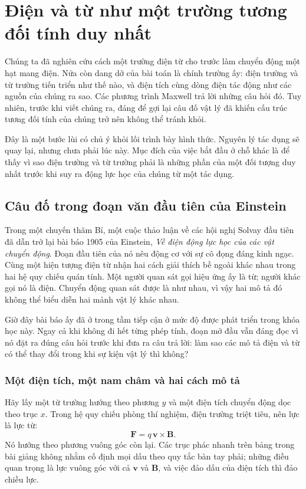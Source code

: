 \chapter{Điện và từ như một trường tương đối tính duy nhất}

Chúng ta đã nghiên cứu cách một trường điện từ cho trước làm chuyển động một hạt mang điện. Nửa còn dang dở của bài toán là chính trường ấy: điện trường và từ trường tiến triển như thế nào, và điện tích cùng dòng điện tác động như các nguồn của chúng ra sao. Các phương trình Maxwell trả lời những câu hỏi đó. Tuy nhiên, trước khi viết chúng ra, đáng để gợi lại câu đố vật lý đã khiến cấu trúc tương đối tính của chúng trở nên không thể tránh khỏi.

Đây là một bước lùi có chủ ý khỏi lối trình bày hình thức. Nguyên lý tác dụng sẽ quay lại, nhưng chưa phải lúc này. Mục đích của việc bắt đầu ở chỗ khác là để thấy vì sao điện trường và từ trường phải là những phần của một đối tượng duy nhất trước khi suy ra động lực học của chúng từ một tác dụng.

\section{Câu đố trong đoạn văn đầu tiên của Einstein}

Trong một chuyến thăm Bỉ, một cuộc thảo luận về các hội nghị Solvay đầu tiên đã dẫn trở lại bài báo 1905 của Einstein, \emph{Về điện động lực học của các vật chuyển động}. Đoạn đầu tiên của nó nêu động cơ với sự cô đọng đáng kinh ngạc. Cùng một hiện tượng điện từ nhận hai cách giải thích bề ngoài khác nhau trong hai hệ quy chiếu quán tính. Một người quan sát gọi hiệu ứng ấy là từ; người khác gọi nó là điện. Chuyển động quan sát được là như nhau, vì vậy hai mô tả đó không thể biểu diễn hai mảnh vật lý khác nhau.

Giờ đây bài báo ấy đã ở trong tầm tiếp cận ở mức độ được phát triển trong khóa học này. Ngay cả khi không đi hết từng phép tính, đoạn mở đầu vẫn đáng đọc vì nó đặt ra đúng câu hỏi trước khi đưa ra câu trả lời: làm sao các mô tả điện và từ có thể thay đổi trong khi sự kiện vật lý thì không?

\subsection{Một điện tích, một nam châm và hai cách mô tả}

Hãy lấy một từ trường hướng theo phương \(y\) và một điện tích chuyển động dọc theo trục \(x\). Trong hệ quy chiếu phòng thí nghiệm, điện trường triệt tiêu, nên lực là lực từ:
\begin{equation}
\mathbf F=q\,\mathbf v\times\mathbf B.
\end{equation}
Nó hướng theo phương vuông góc còn lại. Các trục phác nhanh trên bảng trong bài giảng không nhằm cố định mọi dấu theo quy tắc bàn tay phải; những điều quan trọng là lực vuông góc với cả \(\mathbf v\) và \(\mathbf B\), và việc đảo dấu của điện tích thì đảo chiều lực.

